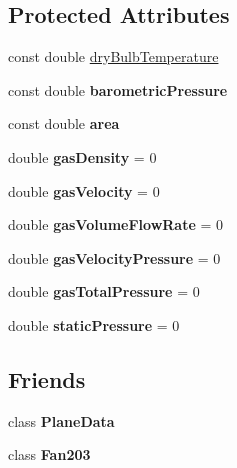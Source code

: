 \subsection*{Protected Attributes}
\begin{DoxyCompactItemize}
\item 
const double \hyperlink{class_planar_afdc9d4149cae09c9e49aa323a814616c}{dry\+Bulb\+Temperature}
\item 
\mbox{\label{class_planar_a0a2be6e6cadb8550921914ecdd43b80f}} 
const double {\bfseries barometric\+Pressure}
\item 
\mbox{\label{class_planar_a561590931d1cb7b592eeba9f3685d3c3}} 
const double {\bfseries area}
\item 
\mbox{\label{class_planar_a3585f60cf8a2a9e4b80954118337c8cf}} 
double {\bfseries gas\+Density} = 0
\item 
\mbox{\label{class_planar_adf99a402e9af6a851ee94bd8dad5700a}} 
double {\bfseries gas\+Velocity} = 0
\item 
\mbox{\label{class_planar_a6597ec3a9de6863ecfe3c5e923048783}} 
double {\bfseries gas\+Volume\+Flow\+Rate} = 0
\item 
\mbox{\label{class_planar_a4bec44a97d38f8b98d3839c885350512}} 
double {\bfseries gas\+Velocity\+Pressure} = 0
\item 
\mbox{\label{class_planar_a67711087a384aa3165fb7990e72193c5}} 
double {\bfseries gas\+Total\+Pressure} = 0
\item 
\mbox{\label{class_planar_a4ee994f45b58125cbd81998a84f860a6}} 
double {\bfseries static\+Pressure} = 0
\end{DoxyCompactItemize}
\subsection*{Friends}
\begin{DoxyCompactItemize}
\item 
\mbox{\label{class_planar_a31f6bbdce0894df6a817f493afffda84}} 
class {\bfseries Plane\+Data}
\item 
\mbox{\label{class_planar_ad537df0087a4a6f474dc9d50579cc33d}} 
class {\bfseries Fan203}
\end{DoxyCompactItemize}


